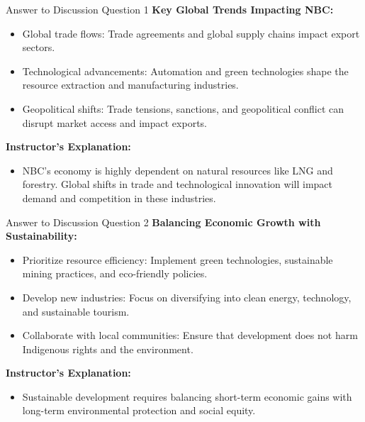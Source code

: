 \documentclass{beamer}
\begin{document}
\begin{frame}{Answer to Discussion Question 1}
    \textbf{Key Global Trends Impacting NBC:}
    \begin{itemize}
        \item Global trade flows: Trade agreements and global supply chains impact export sectors.
        \item Technological advancements: Automation and green technologies shape the resource extraction and manufacturing industries.
        \item Geopolitical shifts: Trade tensions, sanctions, and geopolitical conflict can disrupt market access and impact exports.
    \end{itemize}
    \textbf{Instructor's Explanation:}
    \begin{itemize}
        \item NBC’s economy is highly dependent on natural resources like LNG and forestry. Global shifts in trade and technological innovation will impact demand and competition in these industries.
    \end{itemize}
\end{frame}

\begin{frame}{Answer to Discussion Question 2}
    \textbf{Balancing Economic Growth with Sustainability:}
    \begin{itemize}
        \item Prioritize resource efficiency: Implement green technologies, sustainable mining practices, and eco-friendly policies.
        \item Develop new industries: Focus on diversifying into clean energy, technology, and sustainable tourism.
        \item Collaborate with local communities: Ensure that development does not harm Indigenous rights and the environment.
    \end{itemize}
    \textbf{Instructor's Explanation:}
    \begin{itemize}
        \item Sustainable development requires balancing short-term economic gains with long-term environmental protection and social equity.
    \end{itemize}
\end{frame}
\end{document}
